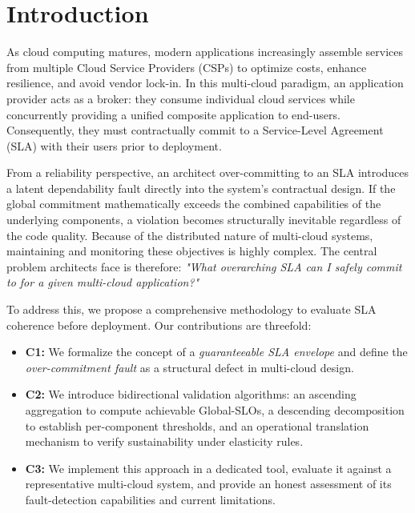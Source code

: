 \documentclass[conference]{IEEEtran}
\begin{document}
\section{Introduction}\label{sec:intro}

As cloud computing matures, modern applications increasingly assemble services from multiple Cloud Service Providers (CSPs) to optimize costs, enhance resilience, and avoid vendor lock-in. In this multi-cloud paradigm, an application provider acts as a broker: they consume individual cloud services while concurrently providing a unified composite application to end-users. Consequently, they must contractually commit to a Service-Level Agreement (SLA) with their users prior to deployment. 

From a reliability perspective, an architect over-committing to an SLA introduces a latent dependability fault directly into the system's contractual design. If the global commitment mathematically exceeds the combined capabilities of the underlying components, a violation becomes structurally inevitable regardless of the code quality. Because of the distributed nature of multi-cloud systems, maintaining and monitoring these objectives is highly complex. The central problem architects face is therefore: \textit{"What overarching SLA can I safely commit to for a given multi-cloud application?"}

To address this, we propose a comprehensive methodology to evaluate SLA coherence before deployment. Our contributions are threefold:
\begin{itemize}
    \item \textbf{C1:} We formalize the concept of a \textit{guaranteeable SLA envelope} and define the \textit{over-commitment fault} as a structural defect in multi-cloud design.
    \item \textbf{C2:} We introduce bidirectional validation algorithms: an ascending aggregation to compute achievable Global-SLOs, a descending decomposition to establish per-component thresholds, and an operational translation mechanism to verify sustainability under elasticity rules.
    \item \textbf{C3:} We implement this approach in a dedicated tool, evaluate it against a representative multi-cloud system, and provide an honest assessment of its fault-detection capabilities and current limitations.
\end{itemize}
\end{document}
